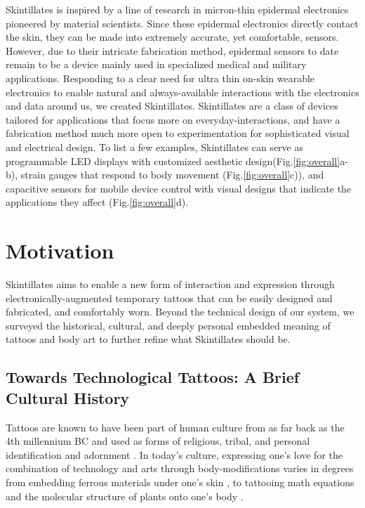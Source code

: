 \documentclass{sigchi}
\begin{document}
Skintillates is inspired by a line of research in micron-thin epidermal electronics pioneered by material scientists. Since these epidermal electronics directly contact the skin, they can be made into extremely accurate, yet comfortable, sensors. However, due to their intricate fabrication method, epidermal sensors to date remain to be a device mainly used in specialized medical and military applications. Responding to a clear need for ultra thin on-skin wearable electronics to enable natural and always-available interactions with the electronics and data around us\cite{MunehikoSato:2012we,chris:2011ve,ChrisHarrison:2010vi,DavidKim:2012uu,Harrison:2014ft,Laput:2014du}, we created Skintillates. Skintillates are a class of devices tailored for applications that focus more on everyday-interactions, and have a fabrication method much more open to experimentation for sophisticated visual and electrical design. To list a few examples, Skintillates can serve as programmable LED displays with customized aesthetic design(Fig.\ref{fig:overall}a-b), strain gauges that respond to body movement (Fig.\ref{fig:overall}c)), and capacitive sensors for mobile device control with visual designs that indicate the applications they affect (Fig.\ref{fig:overall}d). 

\section{Motivation}
Skintillates aims to enable a new form of interaction and expression through electronically-augmented temporary tattoos that can be easily designed and fabricated, and comfortably worn. Beyond the technical design of our system, we surveyed the historical, cultural, and deeply personal embedded meaning of tattoos and body art to further refine what Skintillates should be.

\subsection{Towards Technological Tattoos: A Brief Cultural History}

Tattoos are known to have been part of human culture from as far back as the 4th millennium BC and used as forms of religious,  tribal, and personal  identification  and adornment \cite{Grognard:o1z3U5M2}. In today's culture, expressing  one’s  love  for the combination of technology and arts through body-modifications varies in degrees from  embedding  ferrous  materials  under one’s skin \cite{Norton:OK5Z52w0}, to tattooing math equations and the molecular structure of plants onto one’s body \cite{Zimmer:2011wb}. 
\end{document}
